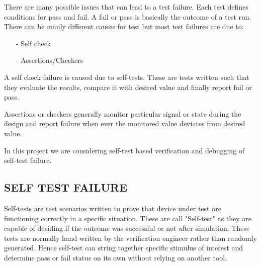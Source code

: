 There are many possible issues that can lead to a test failure. Each test defines conditions for pass and fail. A fail or pass is basically the outcome of a test run. There can be manly different causes for test but most test failures are due to:    

\begin{itemize}
	\item[-] Self check 
	\item[-] Assertions/Checkers
\end{itemize}

A self check failure is caused due to self-tests. These are tests written such that they evaluate the results, compare it with desired value and finally report fail or pass. 

Assertions or checkers generally monitor particular signal or state during the design and report failure when ever the monitored value deviates from desired value. 

In this project we are considering self-test based verification and debugging of self-test failure.

%
%
%

\subsection {SELF TEST FAILURE}

Self-tests are test scenarios written to prove that device under test are functioning correctly in a specific situation. These are call "Self-test" as they are capable of deciding if the outcome was successful or not after simulation. These tests are normally hand written by the verification engineer rather than randomly generated.  Hence self-test can string together specific stimulus of interest and determine pass or fail status on its own without relying on another tool. \\

